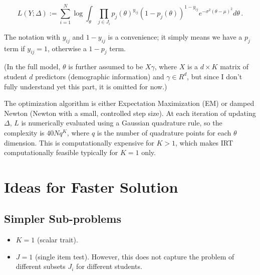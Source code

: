 \documentclass{article}
\begin{document}
\begin{equation}
	L(Y;\Delta) := \sum_{i=1}^N \log \int_{\theta} \prod_{j \in J_i} p_j(\theta)^{y_{ij}} (1 - p_j(\theta))^{1-y_{ij}} e^{-\sigma^2 (\theta-\mu)^2} d \theta\,.
\end{equation}

The notation with $y_{ij}$ and $1-y_{ij}$ is a convenience; it simply means we have a $p_j$ term if $y_{ij}=1$, otherwise a $1-p_j$ term.

(In the full model, $\theta$ is further assumed to be $X \gamma$, where $X$ is a $d \times K$ matrix of student $d$ predictors (demographic information) and $\gamma \in R^d$, but since I don't fully understand yet this part, it is omitted for now.)

The optimization algorithm is either Expectation Maximization (EM) or damped Newton (Newton with a small, controlled step size). At each iteration of updating $\Delta$, $L$ is numerically evaluated using a Gaussian quadrature rule, so the complexity is $40 N q^K$, where $q$ is the number of quadrature points for each $\theta$ dimension. This is computationally expensive for $K > 1$, which makes IRT computationally feasible typically for $K = 1$ only.


\section{Ideas for Faster Solution}
\subsection{Simpler Sub-problems}
\begin{itemize}
\item $K=1$ (scalar trait).
\item $J=1$ (single item test). However, this does not capture the problem of different subsets $J_i$ for different students.
\end{itemize}
\end{document}
